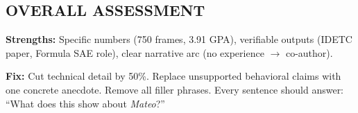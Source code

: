\documentclass[12pt]{article}
\begin{document}
\subsection*{OVERALL ASSESSMENT}

\textbf{Strengths:} Specific numbers (750 frames, 3.91 GPA), verifiable outputs (IDETC paper, Formula SAE role), clear narrative arc (no experience $\to$ co-author).

\textbf{Fix:} Cut technical detail by 50\%. Replace unsupported behavioral claims with one concrete anecdote. Remove all filler phrases. Every sentence should answer: ``What does this show about \emph{Mateo}?''
\end{document}
